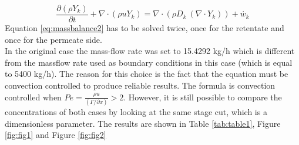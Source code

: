 \begin{equation}
\frac{\partial (\rho Y_k)}{\partial t} + \nabla \cdot \left( \rho u Y_k\right)
= \nabla \cdot \left( \rho D_k \ \left(\nabla \cdot Y_k\right) \right) + \dot{w_k}
\label{eq:massbalance2}
\end{equation}
Equation \ref{eq:massbalance2} has to be solved twice, once for the retentate and once for the permeate side.\\ 

In the original case the mass-flow rate was set to 15.4292 kg/h which is different from the massflow rate used as boundary conditions in this case (which is equal to 5400 kg/h). The reason for this choice is the fact that the equation must be convection controlled to produce reliable results. The formula is convection controlled when $Pe = \frac{\rho u}{\left(\Gamma/\partial x\right)} >2$. However, it is still possible to compare the  concentrations of both cases by looking at the same stage cut, which is a dimensionless parameter. The results are shown in  Table \ref{tab:table1}, Figure \ref{fig:fig1} and Figure \ref{fig:fig2}


